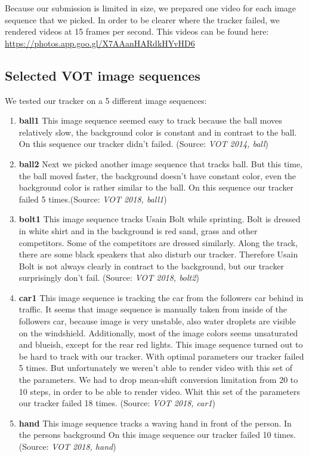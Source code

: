 \documentclass[runningheads]{llncs}
\begin{document}
Because our submission is limited in size, we prepared one video for each image sequence that we picked. In order to be clearer where the tracker failed, we rendered videos at 15 frames per second. This videos can be found here: \url{https://photos.app.goo.gl/X7AAanHARdkHYvHD6}

\subsection{Selected VOT image sequences}

We tested our tracker on a 5 different image sequences:
\begin{enumerate}
\item \textbf{ball1} This image sequence seemed easy to track because the ball moves relatively slow, the background color is constant and in contrast to the ball. On this sequence our tracker didn't failed. (Source: \textit{VOT 2014, ball})
\item \textbf{ball2} Next we picked another image sequence that tracks ball. But this time, the ball moved faster, the background doesn't have constant color, even the background color is rather similar to the ball. On this sequence our tracker failed 5 times.(Source: \textit{VOT 2018, ball1})
\item \textbf{bolt1} This image sequence tracks Usain Bolt while sprinting. Bolt is dressed in white shirt and in the background is red sand, grass and other competitors. Some of the competitors are dressed similarly. Along the track, there are some black speakers that also disturb our tracker. Therefore Usain Bolt is not always clearly in contract to the background, but our tracker surprisingly don't fail. (Source: \textit{VOT 2018, bolt2})
\item \textbf{car1} This image sequence is tracking the car from the followers car behind in traffic. It seems that image sequence is manually taken from inside of the followers car, because image is very unstable, also water droplets are visible on the windshield. Additionally, most of the image colors seems unsaturated and blueish, except for the rear red lights. This image sequence turned out to be hard to track with our tracker. With optimal parameters our tracker failed 5 times. But unfortunately we weren't able to render video with this set of the parameters. We had to drop mean-shift conversion limitation from 20 to 10 steps, in order to be able to render video. Whit this set of the parameters our tracker failed 18 times. (Source: \textit{VOT 2018, car1})
\item \textbf{hand} This image sequence tracks a waving hand in front of the person. In the persons background  On this image sequence our tracker failed 10 times. (Source: \textit{VOT 2018, hand})
\end{enumerate}
\end{document}
